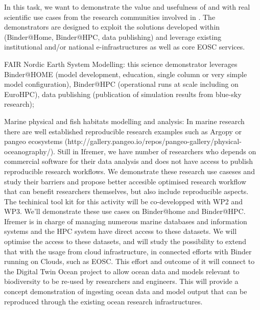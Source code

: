 \begin{task}[
  title=Science demonstrators,
  id=demos,
  lead=MP,
  PM=8,
  wphases={0-36},
  partners={IFR,UIO}
]

  In this task, we want to demonstrate the value and usefulness of  and
   with real scientific use cases from the research communities involved in \TheProject.
  The demonstrators are designed to exploit the solutions developed within \TheProject (Binder@Home, Binder@HPC, data publishing)
  and leverage existing institutional and/or national e-infrastructures as well as core EOSC services.

  \begin{compactitem}
  \item FAIR Nordic Earth System Modelling: this science demonstrator leverages Binder@HOME (model development, education, single column or very simple model configuration), Binder@HPC (operational runs at scale including on EuroHPC), data publishing (publication of simulation results from blue-sky research);
  \item Marine physical and fish habitats modelling and analysis: In marine research there are well established reproducible research examples such as Argopy   or pangeo ecosystems (http://gallery.pangeo.io/repos/pangeo-gallery/physical-oceanography/). Still in Ifremer, we have number of researchers who depends on commercial software for their data analysis and does not have access to publish reproducible research workflows.  We demonstrate these research use caseses and study their barriers and propose better accesible optimised research workflow that can benefit researchers themselves, but also include reproducible aspects.   The techinical tool kit for this activity will be co-developped with WP2 and WP3. We'll demonstrate these use cases on Binder@home and Binder@HPC. Ifremer is in charge of managing numerous marine databases and information systems and the HPC system have direct access to these datasets.  We will optimise the access to these datasets, and will study the possibility to extend that with the usage from cloud infrastructure, in connected efforts with Binder running on Clouds, such as EOSC. 
This effort and outcome of it will connect to the Digital Twin Ocean project to allow ocean data and models relevant to biodiversity to be re-used by researchers and engineers. This will provide a concept demonstration of ingesting ocean data and model output that can be reproduced through the existing ocean research infrastructures.

  \end{compactitem}
\end{task}
